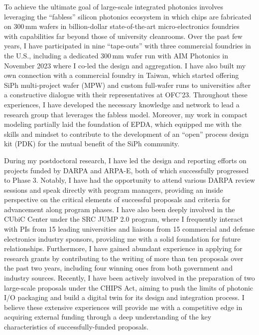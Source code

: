 To achieve the ultimate goal of large-scale integrated photonics involves leveraging the ``fabless'' silicon photonics ecosystem in which chips are fabricated on 300\,mm wafers in billion-dollar state-of-the-art micro-electronics foundries with capabilities far beyond those of university cleanrooms. Over the past few years, I have participated in nine ``tape-outs'' with three commercial foundries in the U.S., including a dedicated 300\,mm wafer run with AIM Photonics in November 2023 where I co-led the design and aggregation. I have also built my own connection with a commercial foundry in Taiwan, which started offering SiPh multi-project wafer (MPW) and custom full-wafer runs to universities after a constructive dialogue with their representatives at OFC'23. Throughout these experiences, I have developed the necessary knowledge and network to lead a research group that leverages the fabless model. Moreover, my \myDegree{} work in compact modeling partially laid the foundation of EPDA, which equipped me with the skills and mindset to contribute to the development of an ``open'' process design kit (PDK) for the mutual benefit of the SiPh community.

During my postdoctoral research, I have led the design and reporting efforts on projects funded by DARPA and ARPA-E, both of which successfully progressed to Phase 3. Notably, I have had the opportunity to attend various
DARPA review sessions and speak directly with program managers, providing an inside perspective on the
critical elements of successful proposals and criteria for advancement along program phases. I have also been deeply involved in the CUbiC Center under the SRC JUMP 2.0 program, where I frequently interact with PIs from 15 leading universities and liaisons from 15 commercial and defense electronics industry sponsors, providing me with a solid foundation for future relationships. Furthermore, I have gained abundant experience in applying for research grants by contributing to the writing of more than ten proposals over the past two years, including four winning ones from both government and industry sources. Recently, I have been actively involved in the preparation of two large-scale proposals under the CHIPS Act, aiming to push the limits of photonic I/O packaging and build a digital twin for its design and integration process. I believe these extensive experiences will provide me with a competitive edge in acquiring external funding through a deep understanding of the key characteristics of successfully-funded proposals.

